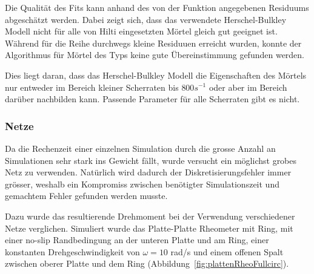 Die Qualität des Fits kann anhand des von der Funktion  angegebenen Residuums abgeschätzt werden. Dabei zeigt sich, dass das verwendete Herschel-Bulkley Modell nicht für alle von Hilti eingesetzten Mörtel gleich gut geeignet ist. Während für die \hit{} Reihe durchwegs kleine Residuuen erreicht wurden, konnte der Algorithmus für Mörtel des \re{} Typs keine gute Übereinstimmung gefunden werden.

Dies liegt daran, dass das Herschel-Bulkley Modell die Eigenschaften des Mörtels nur entweder im Bereich kleiner Scherraten bis $800 s^{-1}$ oder aber im Bereich darüber nachbilden kann. Passende Parameter für alle Scherraten gibt es nicht.
%
\subsubsection{Netze}
Da die Rechenzeit einer einzelnen Simulation durch die grosse Anzahl an Simulationen sehr stark ins Gewicht fällt, wurde versucht ein möglichst grobes Netz zu verwenden. Natürlich wird dadurch der Diskretisierungsfehler immer grösser, weshalb ein Kompromiss zwischen benötigter Simulationszeit und gemachtem Fehler gefunden werden musste.

Dazu wurde das resultierende Drehmoment bei der Verwendung verschiedener Netze verglichen. Simuliert wurde das Platte-Platte Rheometer mit Ring, mit einer \glqq{}no-slip\grqq{} Randbedingung an der unteren Platte und am Ring, einer konstanten Drehgeschwindigkeit von $\omega=10$ rad/s und einem offenen Spalt zwischen oberer Platte und dem Ring (Abbildung~\ref{fig:plattenRheoFullcirc}). 

